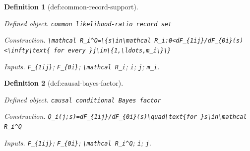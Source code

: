 \documentclass{article}
\newtheorem{definition}{Definition}
\begin{document}
\begin{definition}[def:common-record-support]\label{def:common-record-support}
\par\smallskip\noindent\emph{Defined object.} \texttt{common likelihood-\allowbreak{}ratio record set}
\par\smallskip\noindent\emph{Construction.} \texttt{\textbackslash{}\allowbreak{}mathcal R\_\allowbreak{}i\textasciicircum{}Q=\allowbreak{}\textbackslash{}\allowbreak{}\{s\textbackslash{}\allowbreak{}in\textbackslash{}\allowbreak{}mathcal R\_\allowbreak{}i:\allowbreak{}0<dF\_\allowbreak{}\{1ij\}\allowbreak{}/\allowbreak{}dF\_\allowbreak{}\{0i\}\allowbreak{}(s)<\textbackslash{}\allowbreak{}infty\textbackslash{}\allowbreak{}text\{ for every \}\allowbreak{}j\textbackslash{}\allowbreak{}in\textbackslash{}\allowbreak{}\{1,\allowbreak{}\textbackslash{}\allowbreak{}ldots,\allowbreak{}m\_\allowbreak{}i\textbackslash{}\allowbreak{}\}\allowbreak{}\textbackslash{}\allowbreak{}\}\allowbreak{}}
\par\smallskip\noindent\emph{Inputs.} \texttt{F\_\allowbreak{}\{1ij\}\allowbreak{}}; \texttt{F\_\allowbreak{}\{0i\}\allowbreak{}}; \texttt{\textbackslash{}\allowbreak{}mathcal R\_\allowbreak{}i}; \texttt{i}; \texttt{j}; \texttt{m\_\allowbreak{}i}.
\end{definition}

\begin{definition}[def:causal-bayes-factor]\label{def:causal-bayes-factor}
\par\smallskip\noindent\emph{Defined object.} \texttt{causal conditional Bayes factor}
\par\smallskip\noindent\emph{Construction.} \texttt{Q\_\allowbreak{}i(j;\allowbreak{}s)=\allowbreak{}dF\_\allowbreak{}\{1ij\}\allowbreak{}/\allowbreak{}dF\_\allowbreak{}\{0i\}\allowbreak{}(s)\textbackslash{}\allowbreak{}quad\textbackslash{}\allowbreak{}text\{for \}\allowbreak{}s\textbackslash{}\allowbreak{}in\textbackslash{}\allowbreak{}mathcal R\_\allowbreak{}i\textasciicircum{}Q}
\par\smallskip\noindent\emph{Inputs.} \texttt{F\_\allowbreak{}\{1ij\}\allowbreak{}}; \texttt{F\_\allowbreak{}\{0i\}\allowbreak{}}; \texttt{\textbackslash{}\allowbreak{}mathcal R\_\allowbreak{}i\textasciicircum{}Q}; \texttt{i}; \texttt{j}.
\end{definition}
\end{document}
